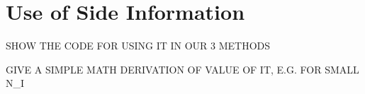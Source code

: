 \chapter{Use of Side Information}  
\label{chap:overfit} 

SHOW THE CODE FOR USING IT IN OUR 3 METHODS

GIVE A SIMPLE MATH DERIVATION OF VALUE OF IT, E.G. FOR SMALL N_I


